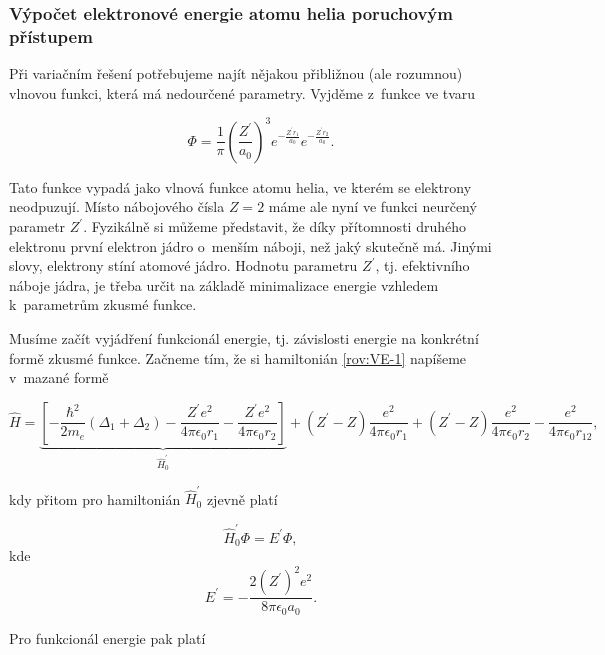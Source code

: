 \subsubsection{Výpočet elektronové energie atomu helia poruchovým přístupem}

Při variačním řešení potřebujeme najít nějakou přibližnou (ale rozumnou) vlnovou funkci, která má nedourčené parametry. Vyjděme z~funkce ve tvaru


\begin{equation}
\Phi = \frac{1}{\pi} \left(\frac{Z^{\prime}}{a_0} \right)^3 e^{-\frac{Z^{\prime} r_1}{a_0}} e^{-\frac{Z^{\prime} r_2}{a_0}}.
\label{rov:VE-16}
\end{equation}

Tato funkce vypadá jako vlnová funkce atomu helia, ve kterém se elektrony neodpuzují. Místo nábojového čísla $Z = 2$ máme ale nyní ve funkci neurčený parametr $Z^{\prime}$. Fyzikálně si můžeme představit, že díky přítomnosti druhého elektronu  první elektron jádro o~menším náboji, než jaký skutečně má. Jinými slovy, elektrony stíní atomové jádro. Hodnotu parametru $Z^{\prime}$, tj. efektivního náboje jádra, je třeba určit na základě minimalizace energie vzhledem k~parametrům zkusmé funkce. 

Musíme začít vyjádření funkcionál energie, tj. závislosti energie na konkrétní formě zkusmé funkce. Začneme tím, že si hamiltonián  \eqref{rov:VE-1} napíšeme v~mazané formě

\begin{equation}
\hat{H} = \underbrace{\left[ - \frac{\hbar^2}{2 m_e} (\Delta_1 + \Delta_2) - \frac{Z^{\prime} e^2}{4 \pi \epsilon_0 r_1} - \frac{Z^{\prime} e^2}{4 \pi \epsilon_0 r_2} \right]}_{\hat{H}_0^{\prime}} + (Z^{\prime} - Z) \frac{e^2}{4 \pi \epsilon_0 r_1} + (Z^{\prime} - Z) \frac{e^2}{4 \pi \epsilon_0 r_2} - \frac{e^2}{4 \pi \epsilon_0 r_{12}} ,
\label{rov:VE-17}
\end{equation}

\noindent kdy přitom pro hamiltonián $\hat{H}_0^{\prime}$ zjevně platí 

\begin{equation}
\hat{H}_0^{\prime} \Phi = E^{\prime} \Phi,
\label{rov:VE-18}
\end{equation}
kde
\begin{equation}
E^{\prime} = - \frac{2 (Z^{\prime})^2 e^2}{8 \pi \epsilon_0 a_0}. \nonumber
\end{equation}

\noindent Pro funkcionál energie pak platí

